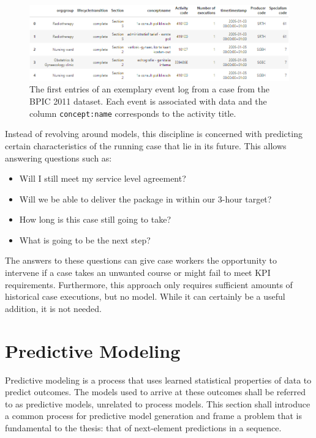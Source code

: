 \begin{figure}
    \centering
    \includegraphics[width=\textwidth]{gfx/process-log}
    \caption{The first entries of an exemplary event log from a case from the BPIC 2011 dataset\cite{BPIC2011}. Each event is associated with data and the column \texttt{concept:name} corresponds to the activity title.}
    \label{fig:process-log}
\end{figure}

Instead of revolving around models, this discipline is concerned with predicting certain characteristics of the running case that lie in its future. This allows answering questions such as:

\begin{itemize}
    \item Will I still meet my service level agreement?
    \item Will we be able to deliver the package in within our 3-hour target?
    \item How long is this case still going to take?
    \item What is going to be the next step?
\end{itemize}

The answers to these questions can give case workers the opportunity to intervene if a case takes an unwanted course or might fail to meet KPI requirements. Furthermore, this approach only requires sufficient amounts of historical case executions, but no model. While it can certainly be a useful addition, it is not needed. 


\section{Predictive Modeling}
Predictive modeling is a process that uses learned statistical properties of data to predict outcomes.
The models used to arrive at these outcomes shall be referred to as predictive models, unrelated to process models.
This section shall introduce a common process for predictive model generation and frame a problem that is fundamental to the thesis: that of next-element predictions in a sequence.

